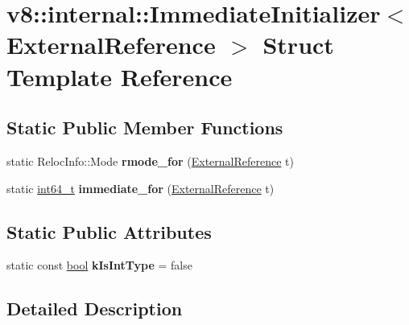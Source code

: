 \hypertarget{structv8_1_1internal_1_1ImmediateInitializer_3_01ExternalReference_01_4}{}\section{v8\+:\+:internal\+:\+:Immediate\+Initializer$<$ External\+Reference $>$ Struct Template Reference}
\label{structv8_1_1internal_1_1ImmediateInitializer_3_01ExternalReference_01_4}
\subsection*{Static Public Member Functions}
\begin{DoxyCompactItemize}
\item 
\mbox{\label{structv8_1_1internal_1_1ImmediateInitializer_3_01ExternalReference_01_4_a33bc1bc7a0f8a0ffc15645ff5386e791}} 
static Reloc\+Info\+::\+Mode {\bfseries rmode\+\_\+for} (\mbox{\hyperlink{classv8_1_1internal_1_1ExternalReference}{External\+Reference}} t)
\item 
\mbox{\label{structv8_1_1internal_1_1ImmediateInitializer_3_01ExternalReference_01_4_a4a97712bacf7929d298c1091bcc5cc46}} 
static \mbox{\hyperlink{classint64__t}{int64\+\_\+t}} {\bfseries immediate\+\_\+for} (\mbox{\hyperlink{classv8_1_1internal_1_1ExternalReference}{External\+Reference}} t)
\end{DoxyCompactItemize}
\subsection*{Static Public Attributes}
\begin{DoxyCompactItemize}
\item 
\mbox{\label{structv8_1_1internal_1_1ImmediateInitializer_3_01ExternalReference_01_4_a82ac8f74395dad5916a560fa329e039b}} 
static const \mbox{\hyperlink{classbool}{bool}} {\bfseries k\+Is\+Int\+Type} = false
\end{DoxyCompactItemize}


\subsection{Detailed Description}
